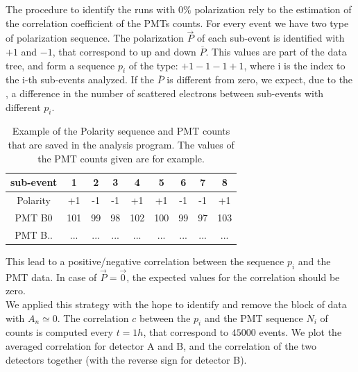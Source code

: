 The procedure to identify the runs with $0\%$ polarization rely to the estimation of the correlation coefficient of the PMTs counts. For every event we have two type of polarization sequence. The polarization $\vec{P}$ of each sub-event is identified with $+1$ and $-1$, that correspond to up and down $\overline{P}$. This values are part of the data tree, and form a sequence $p_{i}$ of the type: $+1-1-1+1$, where i is the index to the i-th sub-events analyzed. If the $\overline{P}$ is different from zero, we expect, due to the \transv, a difference in the number of scattered electrons between sub-events with different $p_{i}$. \medskip

\begin{table}[hbtp]
\centering
\begin{tabular}{|c|c|c|c|c|c|c|c|c|}
\hline 
sub-event & 1 & 2 & 3 & 4 & 5 & 6 & 7 & 8 \\ 
\hline 
Polarity & +1 & -1 & -1 & +1 & +1 & -1 & -1 & +1 \\ 
\hline 
PMT B0 & 101 & 99 & 98 & 102 & 100 & 99 & 97 & 103 \\ 
\hline 
PMT B.. & ... & ... & ... & ... & ... & ... & ... & ... \\ 
\hline
\end{tabular}
\caption{Example of the Polarity sequence and PMT counts that are saved in the analysis program. The values of the PMT counts given are for example. }
\end{table}


This lead to a positive/negative correlation between the sequence $p_{i}$ and the PMT data. In case of $\vec{P} = \vec{0}$, the expected values for the correlation should be zero. \\
We applied this strategy with the hope to identify and remove the block of data with $A_{n} \simeq 0$. The correlation $c$ between the $p_{i}$ and the PMT sequence $N_{i}$ of counts is computed every $t = 1 h$, that correspond to $45000$ events. We plot the averaged correlation for detector A and B, and the correlation of the two detectors together (with the reverse sign for detector B).

